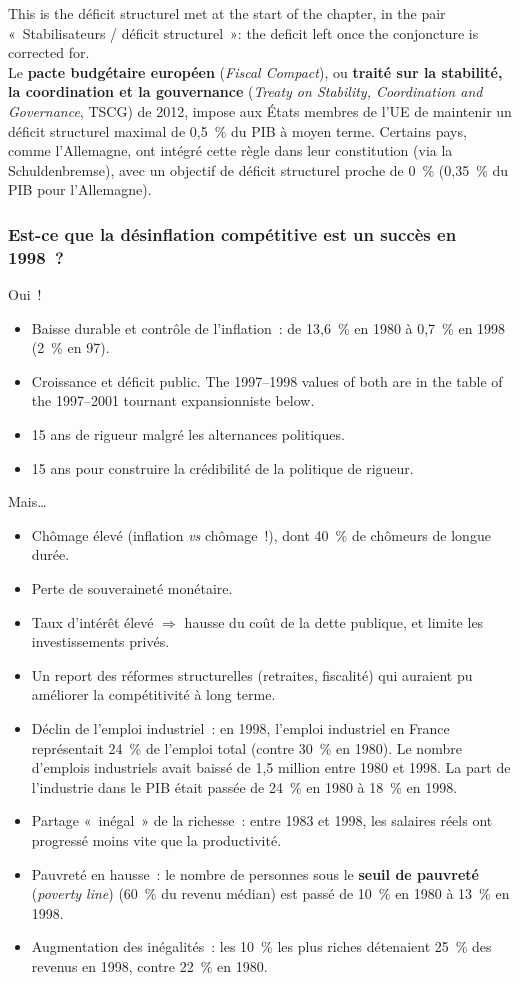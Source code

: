 This is the déficit structurel met at the start of the chapter, in the pair
«~Stabilisateurs / déficit structurel~»: the deficit left once the conjoncture is
corrected for.\\

Le \textbf{pacte budgétaire européen} (\textit{Fiscal Compact}), ou \textbf{traité sur
la stabilité, la coordination et la gouvernance} (\textit{Treaty on Stability,
Coordination and Governance}, TSCG) de 2012, impose aux États membres de l'UE de maintenir un
déficit structurel maximal de 0,5~\% du PIB à moyen terme. Certains pays, comme
l'Allemagne, ont intégré cette règle dans leur constitution (via la Schuldenbremse),
avec un objectif de déficit structurel proche de 0~\% (0,35~\% du PIB pour
l'Allemagne).

\subsubsection{Est-ce que la désinflation compétitive est un succès en 1998~?}

Oui~!
\begin{itemize}
  \item Baisse durable et contrôle de l'inflation~: de 13,6~\% en 1980 à 0,7~\% en 1998
    (2~\% en 97).
  \item Croissance et déficit public. The 1997--1998 values of both are in the table
    of the 1997--2001 tournant expansionniste below.
  \item 15 ans de rigueur malgré les alternances politiques.
  \item 15 ans pour construire la crédibilité de la politique de rigueur.
\end{itemize}
Mais\ldots
\begin{itemize}
  \item Chômage élevé (inflation \emph{vs} chômage~!), dont 40~\% de chômeurs de longue
    durée.
  \item Perte de souveraineté monétaire.
  \item Taux d'intérêt élevé $\Rightarrow$ hausse du coût de la dette publique, et
    limite les investissements privés.
  \item Un report des réformes structurelles (retraites, fiscalité) qui auraient pu
    améliorer la compétitivité à long terme.
  \item Déclin de l'emploi industriel~: en 1998, l'emploi industriel en France
    représentait 24~\% de l'emploi total (contre 30~\% en 1980). Le nombre d'emplois
    industriels avait baissé de 1,5 million entre 1980 et 1998. La part de l'industrie
    dans le PIB était passée de 24~\% en 1980 à 18~\% en 1998.
  \item Partage «~inégal~» de la richesse~: entre 1983 et 1998, les salaires réels ont
    progressé moins vite que la productivité.
  \item Pauvreté en hausse~: le nombre de personnes sous le \textbf{seuil de pauvreté}
    (\textit{poverty line}) (60~\% du revenu médian) est passé de 10~\% en 1980 à 13~\%
    en 1998.
  \item Augmentation des inégalités~: les 10~\% les plus riches détenaient 25~\% des
    revenus en 1998, contre 22~\% en 1980.
\end{itemize}

